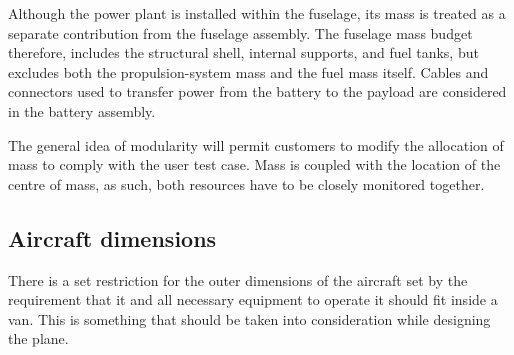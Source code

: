 Although the power plant is installed within the fuselage, its mass is treated as a separate contribution from the fuselage assembly. The fuselage mass budget therefore, includes the structural shell, internal supports, and fuel tanks, but excludes both the propulsion-system mass and the fuel mass itself. Cables and connectors used to transfer power from the battery to the payload are considered in the battery assembly. 


The general idea of modularity will permit customers to modify the allocation of mass to comply with the user test case. Mass is coupled with the location of the centre of mass, as such, both resources have to be closely monitored together. 


\subsection{Aircraft dimensions} 
There is a set restriction for the outer dimensions of the aircraft set by the requirement that it and all necessary equipment to operate it should fit inside a van. This is something that should be taken into consideration while designing the plane. 

